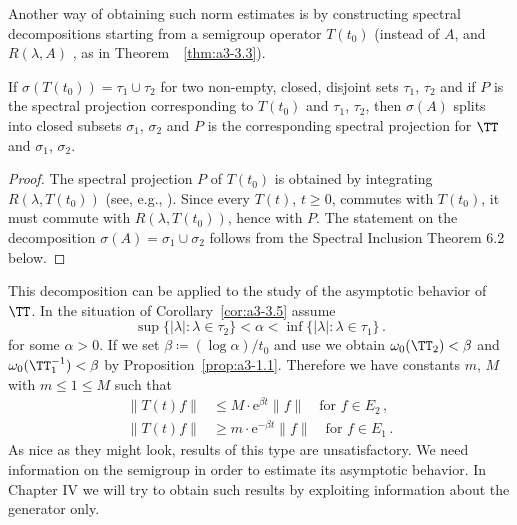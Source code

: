 Another way of obtaining such norm estimates is by constructing spectral decompositions starting from a semigroup operator $T(t_{0})$ (instead of $A$, and $R(\lambda,A)$ \resp, as in Theorem~~\ref{thm:a3-3.3}).
\begin{corollary}\label{cor:a3-3.5}
If $\sigma(T(t_{0})) = \tau_{1} \cup \tau_{2}$ for two non-empty, closed, disjoint sets $\tau_{1}$, $\tau_{2}$ and if $P$ is the spectral projection corresponding to $T(t_{0})$ and $\tau_{1}$, $\tau_{2}$, then $\sigma(A)$ splits into closed subsets $\sigma_{1}$, $\sigma_{2}$ and $P$ is the corresponding spectral projection for $\TT$ and $\sigma_{1}$, $\sigma_{2}$.
\end{corollary}
\begin{proof}
The spectral projection $P$ of $T(t_{0})$ is obtained by integrating $R(\lambda,T(t_{0}))$ (see, e.g., \citet[Section VII.3]{dunfordschwartz:1958}).
Since every $T(t)$, $t \geq 0$, commutes with $T(t_{0})$, it must commute with $R(\lambda,T(t_{0}))$, hence with $P$.
The statement on the decomposition $\sigma(A) = \sigma_{1} \cup \sigma_{2}$ follows from the Spectral Inclusion Theorem 6.2 below.
\end{proof}
This decomposition can be applied to the study of the asymptotic behavior of $\TT$. In the situation of Corollary~\ref{cor:a3-3.5} assume
\[
\sup \{|\lambda| \colon \lambda \in \tau_{2}\} < \alpha < \inf \{|\lambda| \colon \lambda \in \tau_{1}\}\,.
\]
for some $\alpha > 0$. If we set $\beta \coloneqq (\log\alpha)/t_{0}$ and use \citet[Chap.I,Theorem~6.5]{pazy:1983} we obtain $\omega_{0}(\TT_{2}) < \beta$ and $\omega_{0}(\TT_{1}^{-1}) < \beta$ by Proposition~\ref{prop:a3-1.1}.
Therefore we have constants $m$, $M$ with $m \le 1 \le M $ such that
\begin{align*}
	\|T(t)f\| &\leq M \cdot \mathrm{e}^{\beta t}\|f\| \quad \text{for } f \in E_{2}\,, \\
	\|T(t)f\| &\geq m \cdot \mathrm{e}^{-\beta t}\|f\| \quad \text{for } f \in E_{1}\,.
\end{align*}
As nice as they might look, results of this type are unsatisfactory. We need information on the semigroup in order to estimate its asymptotic behavior.
In Chapter IV we will try to obtain such results by exploiting information about the generator only.
